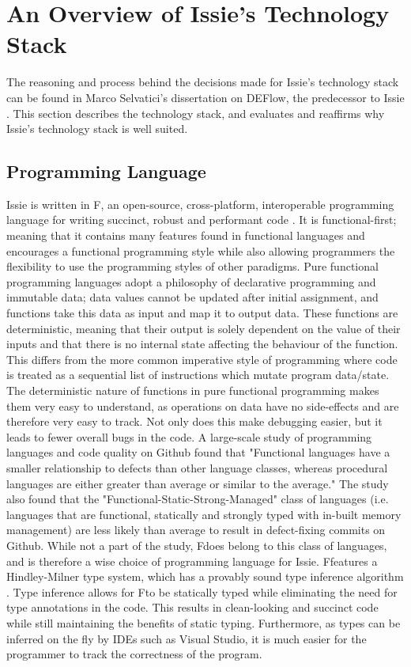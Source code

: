 \section{An Overview of Issie's Technology Stack} \label{sec:techstack}

The reasoning and process behind the decisions made for Issie's technology stack can be found in Marco Selvatici's dissertation on DEFlow, the predecessor to Issie \cite{marco_diss}. This section describes the technology stack, and evaluates and reaffirms why Issie's technology stack is well suited.

\subsection{Programming Language} \label{subsec:fsharp}
Issie is written in F\fsharp, an open-source, cross-platform, interoperable programming language for writing succinct, robust and performant code \cite{fsharp}. It is functional-first; meaning that it contains many features found in functional languages and encourages a functional programming style while also allowing programmers the flexibility to use the programming styles of other paradigms. Pure functional programming languages adopt a philosophy of declarative programming and immutable data; data values cannot be updated after initial assignment, and functions take this data as input and map it to output data. These functions are deterministic, meaning that their output is solely dependent on the value of their inputs and that there is no internal state affecting the behaviour of the function. This differs from the more common imperative style of programming where code is treated as a sequential list of instructions which mutate program data/state. The deterministic nature of functions in pure functional programming makes them very easy to understand, as operations on data have no side-effects and are therefore very easy to track. Not only does this make debugging easier, but it leads to fewer overall bugs in the code. A large-scale study of programming languages and code quality on Github \cite{functionaldebug} found that "Functional languages have a smaller relationship to defects than other language classes, whereas procedural languages are either greater than average or similar to the average." The study also found that the "Functional-Static-Strong-Managed" class of languages (i.e. languages that are functional, statically and strongly typed with in-built memory management) are  less likely than average to result in defect-fixing commits on Github.
While not a part of the study, F\fsharp does belong to this class of languages, and is therefore a wise choice of programming language for Issie. F\fsharp features a Hindley-Milner type system, which has a provably sound type inference algorithm \cite{hm_typesis}. Type inference allows for F\fsharp to be statically typed while eliminating the need for type annotations in the code. This results in clean-looking and succinct code while still maintaining the benefits of static typing.  Furthermore, as types can be inferred on the fly by IDEs such as Visual Studio, it is much easier for the programmer to track the correctness of the program. 

